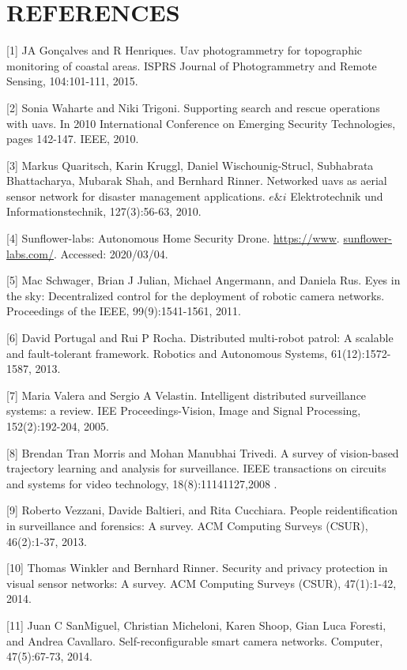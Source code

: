 \documentclass[conference]{IEEEtran}
\begin{document}
\section*{REFERENCES}
[1] JA Gonçalves and R Henriques. Uav photogrammetry for topographic monitoring of coastal areas. ISPRS Journal of Photogrammetry and Remote Sensing, 104:101-111, 2015.

[2] Sonia Waharte and Niki Trigoni. Supporting search and rescue operations with uavs. In 2010 International Conference on Emerging Security Technologies, pages 142-147. IEEE, 2010.

[3] Markus Quaritsch, Karin Kruggl, Daniel Wischounig-Strucl, Subhabrata Bhattacharya, Mubarak Shah, and Bernhard Rinner. Networked uavs as aerial sensor network for disaster management applications. $e \& i$ Elektrotechnik und Informationstechnik, 127(3):56-63, 2010.

[4] Sunflower-labs: Autonomous Home Security Drone. \href{https://www}{https://www}. \href{http://sunflower-labs.com/}{sunflower-labs.com/}. Accessed: 2020/03/04.

[5] Mac Schwager, Brian J Julian, Michael Angermann, and Daniela Rus. Eyes in the sky: Decentralized control for the deployment of robotic camera networks. Proceedings of the IEEE, 99(9):1541-1561, 2011.

[6] David Portugal and Rui P Rocha. Distributed multi-robot patrol: A scalable and fault-tolerant framework. Robotics and Autonomous Systems, 61(12):1572-1587, 2013.

[7] Maria Valera and Sergio A Velastin. Intelligent distributed surveillance systems: a review. IEE Proceedings-Vision, Image and Signal Processing, 152(2):192-204, 2005.

[8] Brendan Tran Morris and Mohan Manubhai Trivedi. A survey of vision-based trajectory learning and analysis for surveillance. IEEE transactions on circuits and systems for video technology, 18(8):11141127,2008 .

[9] Roberto Vezzani, Davide Baltieri, and Rita Cucchiara. People reidentification in surveillance and forensics: A survey. ACM Computing Surveys (CSUR), 46(2):1-37, 2013.

[10] Thomas Winkler and Bernhard Rinner. Security and privacy protection in visual sensor networks: A survey. ACM Computing Surveys (CSUR), 47(1):1-42, 2014.

[11] Juan C SanMiguel, Christian Micheloni, Karen Shoop, Gian Luca Foresti, and Andrea Cavallaro. Self-reconfigurable smart camera networks. Computer, 47(5):67-73, 2014.
\end{document}
